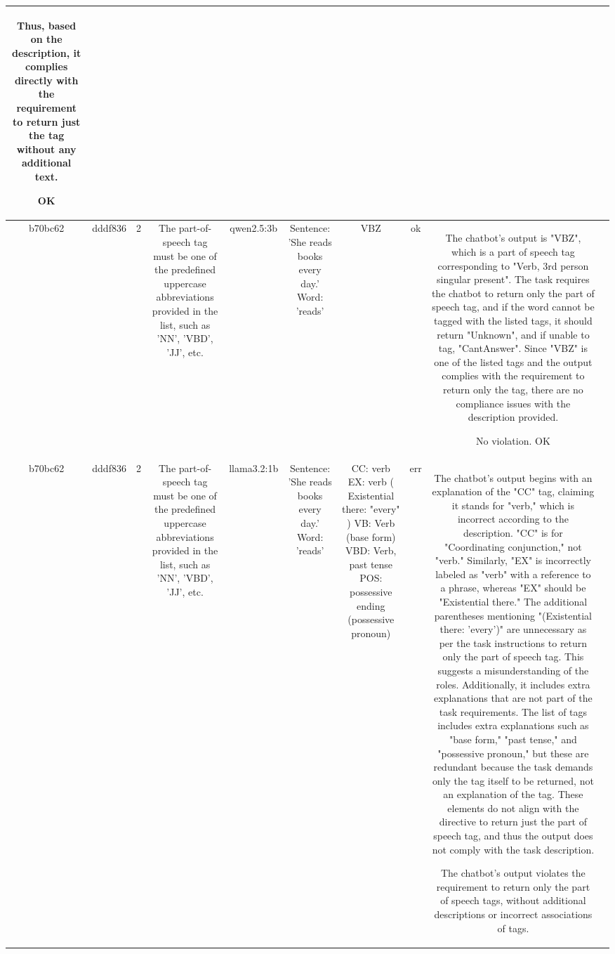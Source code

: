 \begin{table}[h!]
\begin{tabular}{|c|c|c|c|c|c|c|c|c|c|}
Thus, based on the description, it complies directly with the requirement to return just the tag without any additional text.

OK & \\
\hline
b70bc62 & dddf836 & 2 & The part-of-speech tag must be one of the predefined uppercase abbreviations provided in the list, such as 'NN', 'VBD', 'JJ', etc. & qwen2.5:3b & Sentence: 'She reads books every day.' Word: 'reads' & VBZ & ok & The chatbot's output is "VBZ", which is a part of speech tag corresponding to "Verb, 3rd person singular present". The task requires the chatbot to return only the part of speech tag, and if the word cannot be tagged with the listed tags, it should return "Unknown", and if unable to tag, "CantAnswer". Since "VBZ" is one of the listed tags and the output complies with the requirement to return only the tag, there are no compliance issues with the description provided.

No violation.
OK & \\
\hline
b70bc62 & dddf836 & 2 & The part-of-speech tag must be one of the predefined uppercase abbreviations provided in the list, such as 'NN', 'VBD', 'JJ', etc. & llama3.2:1b & Sentence: 'She reads books every day.' Word: 'reads' & CC: verb
EX: verb ( Existential there: "every" )  
VB: Verb (base form) 
VBD: Verb, past tense 
POS: possessive ending (possessive pronoun) & err & The chatbot's output begins with an explanation of the "CC" tag, claiming it stands for "verb," which is incorrect according to the description. "CC" is for "Coordinating conjunction," not "verb." Similarly, "EX" is incorrectly labeled as "verb" with a reference to a phrase, whereas "EX" should be "Existential there." The additional parentheses mentioning "(Existential there: 'every')" are unnecessary as per the task instructions to return only the part of speech tag. This suggests a misunderstanding of the roles. Additionally, it includes extra explanations that are not part of the task requirements. The list of tags includes extra explanations such as "base form," "past tense," and "possessive pronoun," but these are redundant because the task demands only the tag itself to be returned, not an explanation of the tag. These elements do not align with the directive to return just the part of speech tag, and thus the output does not comply with the task description.

The chatbot's output violates the requirement to return only the part of speech tags, without additional descriptions or incorrect associations of tags.


\end{tabular}
\end{table}
